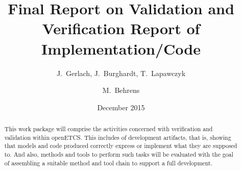 \documentclass{template/openetcs_report}
\numberwithin{figure}{chapter}
\numberwithin{table}{chapter}
\begin{document}
\frontmatter
{}




\title{Final Report on Validation and Verification Report of Implementation/Code}


\date{December 2015}






\author{J.\ Gerlach, J.\ Burghardt, T.\ Lapawczyk}

\author{M.\ Behrens}




\sloppy %

\begin{abstract}
  This work package will comprise the activities concerned with
  verification and validation within openETCS. This includes \vv of
  development artifacts, that is, showing that models and code
  produced correctly express or implement what they are supposed
  to. And also, methods and tools to perform such tasks will be
  evaluated with the goal of assembling a suitable method and tool
  chain to support a full development.
\end{abstract}
\end{document}

